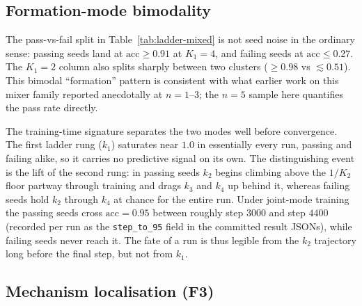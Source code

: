 \documentclass[11pt]{article}
\begin{document}
\subsection{Formation-mode bimodality}
\label{sec:results:bimodality}

The pass-vs-fail split in Table~\ref{tab:ladder-mixed} is not seed noise
in the ordinary sense: passing seeds land at $\text{acc} \geq 0.91$ at
$K_1 = 4$, and failing seeds at $\text{acc} \leq 0.27$. The $K_1{=}2$
column also splits sharply between two clusters ($\geq 0.98$ vs
$\lesssim 0.51$). This bimodal ``formation'' pattern is consistent
with what earlier work on this mixer family reported anecdotally at
$n{=}1$--$3$; the $n{=}5$ sample here quantifies the pass rate directly.

The training-time signature separates the two modes well before
convergence. The first ladder rung ($k_1$) saturates near $1.0$ in
essentially every run, passing and failing alike, so it carries no
predictive signal on its own. The distinguishing event is the lift of the
second rung: in passing seeds $k_2$ begins climbing above the $1/K_2$ floor
partway through training and drags $k_3$ and $k_4$ up behind it, whereas
failing seeds hold $k_2$ through $k_4$ at chance for the entire run. Under
joint-mode training the passing seeds cross $\text{acc} = 0.95$ between
roughly step $3000$ and step $4400$ (recorded per run as the
\texttt{step\_to\_95} field in the committed result JSONs), while failing
seeds never reach it. The fate of a run is thus legible from the $k_2$
trajectory long before the final step, but not from $k_1$.

\subsection{Mechanism localisation (F3)}
\label{sec:results:mechanism}
\end{document}
